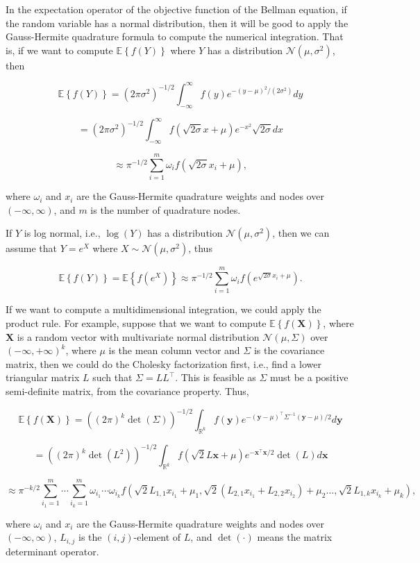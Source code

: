 \documentclass[10pt,a4paper]{article}
\numberwithin{equation}{section} %
\begin{document}
In the expectation operator of the objective function of the Bellman equation, if the random variable has a normal distribution, then it will be good to apply the Gauss-Hermite quadrature formula to compute the numerical integration. That is, if we want to compute \( \mathbb{E} \left\{ f(Y) \right\} \) where \( Y \) has a distribution \( \mathcal{N}(\mu, \sigma^2) \), then

\[
\mathbb{E} \left\{ f(Y) \right\} = (2\pi\sigma^2)^{-1/2} \int_{-\infty}^{\infty} f(y) e^{-(y-\mu)^2/(2\sigma^2)} dy
\]

\[
= (2\pi\sigma^2)^{-1/2} \int_{-\infty}^{\infty} f(\sqrt{2\sigma}x + \mu)e^{-x^2} \sqrt{2\sigma} dx
\]

\[
\approx \pi^{-1/2} \sum_{i=1}^{m} \omega_i f \left( \sqrt{2\sigma}x_i + \mu \right),
\]

where \( \omega_i \) and \( x_i \) are the Gauss-Hermite quadrature weights and nodes over \( (-\infty, \infty) \), and \( m \) is the number of quadrature nodes.

If \( Y \) is log normal, i.e., \( \log(Y) \) has a distribution \( \mathcal{N}(\mu, \sigma^2) \), then we can assume that \( Y = e^X \) where \( X \sim \mathcal{N}(\mu, \sigma^2) \), thus

\[
\mathbb{E} \left\{ f(Y) \right\} = \mathbb{E} \left\{ f(e^X) \right\} \approx \pi^{-1/2} \sum_{i=1}^{m} \omega_i f \left( e^{\sqrt{2\sigma}x_i + \mu} \right).
\]

If we want to compute a multidimensional integration, we could apply the product rule. For example, suppose that we want to compute \( \mathbb{E} \left\{ f(\mathbf{X}) \right\} \), where \( \mathbf{X} \) is a random vector with multivariate normal distribution \( \mathcal{N}(\mu, \Sigma) \) over \( (-\infty, +\infty)^k \), where \( \mu \) is the mean column vector and \( \Sigma \) is the covariance matrix, then we could do the Cholesky factorization first, i.e., find a lower triangular matrix \( L \) such that \( \Sigma = LL^\top \). This is feasible as \( \Sigma \) must be a positive semi-definite matrix, from the covariance property. Thus,

\[
\mathbb{E} \left\{ f(\mathbf{X}) \right\} = ((2\pi)^k \det(\Sigma))^{-1/2} \int_{\mathbb{R}^k} f(\mathbf{y})e^{-(\mathbf{y}-\mu)^\top \Sigma^{-1}(\mathbf{y}-\mu)/2} d\mathbf{y}
\]

\[
= ((2\pi)^k \det(L^2))^{-1/2} \int_{\mathbb{R}^k} f \left( \sqrt{2}L\mathbf{x} + \mu \right)e^{-\mathbf{x}^\top \mathbf{x}/2} \det(L) d\mathbf{x}
\]

\[
\approx \pi^{-k/2} \sum_{i_1=1}^{m} \cdots \sum_{i_k=1}^{m} \omega_{i_1} \cdots \omega_{i_k} f \left( \sqrt{2} L_{1,1} x_{i_1} + \mu_1, \sqrt{2} \left( L_{2,1} x_{i_1} + L_{2,2} x_{i_2}  \right) + \mu_2 \ldots, \sqrt{2} L_{1,k}x_{i_k} + \mu_k \right),
\]

where \( \omega_i \) and \( x_i \) are the Gauss-Hermite quadrature weights and nodes over \( (-\infty, \infty) \), \( L_{i,j} \) is the \( (i,j) \)-element of \( L \), and \( \det(\cdot) \) means the matrix determinant operator.

\end{document}
